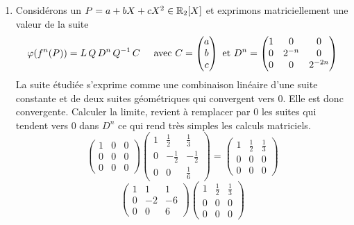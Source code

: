 \begin{enumerate}
 \item Considérons un $P = a + bX + cX^2 \in \mathbb{R}_2[X]$ et exprimons matriciellement une valeur de la suite
\renewcommand{\arraystretch}{1.}
\begin{displaymath}
\varphi(f^n(P)) =  L\,Q\,D^n\,Q^{-1}\,C \hspace{0.5cm} \text{avec }
C=
\begin{pmatrix}
 a \\ b \\ c
\end{pmatrix}
\text{ et }
D^n=
\begin{pmatrix}
 1 & 0 & 0 \\ 0 & 2^{-n} & 0 \\ 0 & 0 & 2^{-2n}
\end{pmatrix}
\end{displaymath}
La suite étudiée s'exprime comme une combinaison linéaire d'une suite constante et de deux suites géométriques qui convergent vers $0$. Elle est donc convergente. Calculer la limite, revient à remplacer par $0$ les suites qui tendent vers $0$ dans $D^n$ ce qui rend très simples les calculs matriciels.
\renewcommand{\arraystretch}{1.3}
\begin{displaymath}
\begin{pmatrix}
 1 & 0 & 0 \\ 0 & 0 & 0 \\ 0 & 0 & 0
\end{pmatrix}
\begin{pmatrix}
 1 & \frac{1}{2} & \frac{1}{3}\\ 0 & -\frac{1}{2} & -\frac{1}{2} \\ 0 & 0 & \frac{1}{6} 
\end{pmatrix} 
=
\begin{pmatrix}
 1 & \frac{1}{2} & \frac{1}{3}\\ 0 & 0 & 0 \\ 0 & 0 & 0 
\end{pmatrix} 
\end{displaymath}
\begin{displaymath}
\begin{pmatrix}
 1 & 1 & 1 \\ 0 & -2 & -6 \\ 0 & 0 & 6
\end{pmatrix}
\begin{pmatrix}
 1 & \frac{1}{2} & \frac{1}{3}\\ 0 & 0 & 0 \\ 0 & 0 & 0 
\end{pmatrix} 

\end{displaymath}
\end{enumerate}
